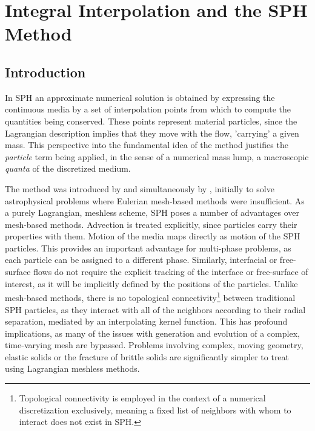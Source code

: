 \section{Integral Interpolation and the SPH Method}
\label{sec:SPH}

\subsection{Introduction}

In \ac{SPH} an approximate numerical solution is obtained by expressing the continuous media by a set of interpolation points from which to compute the quantities being conserved. These points represent material particles, since the Lagrangian description implies that they move with the flow, 'carrying' a given mass. This perspective into the fundamental idea of the method justifies the \emph{particle} term being applied, in the sense of a numerical mass lump, a macroscopic \emph{quanta} of the discretized medium. 

The method was introduced by \cite{Gingold-1977} and simultaneously by \cite{Lucy-1977}, initially to solve astrophysical problems where Eulerian mesh-based methods were insufficient. As a purely Lagrangian, meshless scheme, \ac{SPH} poses a number of advantages over mesh-based methods. Advection is treated explicitly, since particles carry their properties with them. Motion of the media maps directly as motion of the \ac{SPH} particles. This provides an important advantage for multi-phase problems, as each particle can be assigned to a different phase. Similarly, interfacial or free-surface flows do not require the explicit tracking of the interface or free-surface of interest, as it will be implicitly defined by the positions of the particles. Unlike mesh-based methods, there is no topological connectivity\footnote{Topological connectivity is employed in the context of a numerical discretization exclusively, meaning a fixed list of neighbors with whom to interact does not exist in \ac{SPH}.} between traditional \ac{SPH} particles, as they interact with all of the neighbors according to their radial separation, mediated by an interpolating kernel function. This has profound implications, as many of the issues with generation and evolution of a complex, time-varying mesh are bypassed. Problems involving complex, moving geometry, elastic solids or the fracture of brittle solids are significantly simpler to treat using Lagrangian meshless methods.

